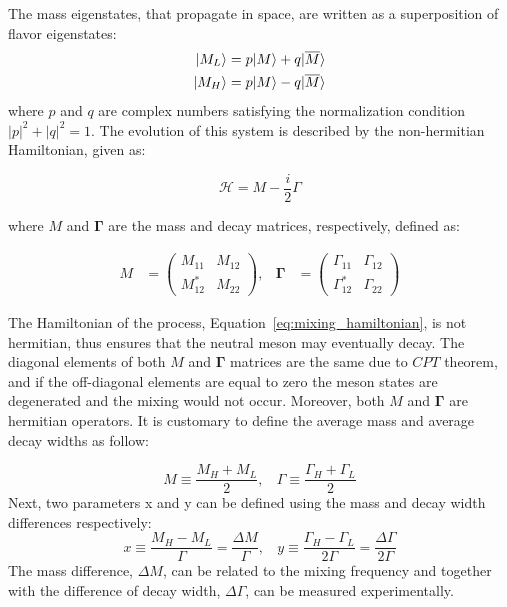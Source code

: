 The mass eigenstates, that propagate in space, are written as a superposition of flavor eigenstates:
\begin{equation}
    \begin{split}
        \lvert M_L\rangle = p \lvert M\rangle + q \lvert\overline{M}\rangle \\
        \lvert M_H\rangle = p \lvert M\rangle - q \lvert\overline{M}\rangle \\
    \end{split}
\end{equation}
 where $p$ and $q$ are complex numbers satisfying the normalization condition $|p|^{2}+|q|^{2} = 1$. 
 The evolution of this system is described by the non-hermitian Hamiltonian, given as:

\begin{equation}
\label{eq:mixing_hamiltonian}
    \mathcal{H}  = M - \frac{i}{2} \Gamma
\end{equation}

where $M$ and $\bm{\Gamma}$ are the mass and decay matrices, respectively, defined as:

\begin{align}
    M &= \left( \begin{matrix} M_{11} & M_{12}  \\ M_{12}^{*} & M_{22} \end{matrix} \right), & 
    \bm{\Gamma} &=  \left( \begin{matrix} \Gamma_{11} & \Gamma_{12}  \\ \Gamma_{12}^{*} & \Gamma_{22} \end{matrix} \right) 
\end{align}

The Hamiltonian of the process, Equation~\ref{eq:mixing_hamiltonian}, is not hermitian, thus ensures that the neutral meson may eventually decay. The diagonal elements of both $M$ and $\bm{\Gamma}$ matrices are the same due to $CPT$  theorem, and if the off-diagonal elements are equal to zero the meson states are degenerated and the mixing would not occur. Moreover, both  $M$ and $\bm{\Gamma}$ are hermitian operators. It is customary to define the average mass and average decay widths as follow:

\begin{equation}
\label{eq:mass_gamma}
    M \equiv \frac{M_{H} + M_{L}}{2}, ~~~~
    \Gamma \equiv \frac{\Gamma_{H} + \Gamma_{L}}{2}
\end{equation}
Next, two parameters x and y can be defined using the mass and decay width differences respectively:
\begin{equation}
\label{eq:x_y}
    x \equiv \frac{M_{H} - M_{L}}{\Gamma} = \frac{\Delta M}{\Gamma}, ~~~~
    y \equiv \frac{\Gamma_{H} - \Gamma_{L}}{2 \Gamma} = \frac{\Delta \Gamma}{2 \Gamma}
\end{equation}
The mass difference, $\Delta M$, can be related to the mixing frequency and together with the difference of decay width, $\Delta \Gamma$, can be measured experimentally.

